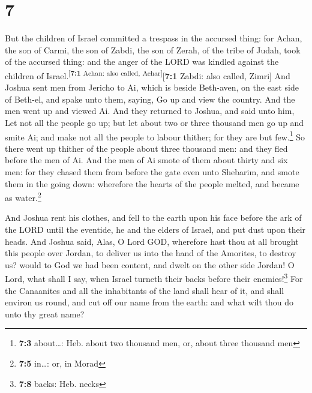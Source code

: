 \hypertarget{section-6}{%
\section{7}\label{section-6}}

 But the children of Israel committed a trespass in the
accursed thing: for Achan, the son of Carmi, the son of Zabdi, the son
of Zerah, of the tribe of Judah, took of the accursed thing: and the
anger of the LORD was kindled against the children of
Israel.\textsuperscript{{[}\textbf{7:1} Achan: also called,
Achar{]}}{[}\textbf{7:1} Zabdi: also called, Zimri{]}  And
Joshua sent men from Jericho to Ai, which is beside Beth-aven, on the
east side of Beth-el, and spake unto them, saying, Go up and view the
country. And the men went up and viewed Ai.  And they
returned to Joshua, and said unto him, Let not all the people go up; but
let about two or three thousand men go up and smite Ai; and make not all
the people to labour thither; for they are but few.\footnote{\textbf{7:3}
  about\ldots: Heb. about two thousand men, or, about three thousand men}
 So there went up thither of the people about three
thousand men: and they fled before the men of Ai.  And the
men of Ai smote of them about thirty and six men: for they chased them
from before the gate even unto Shebarim, and smote them in the going
down: wherefore the hearts of the people melted, and became as
water.\footnote{\textbf{7:5} in\ldots: or, in Morad}

 And Joshua rent his clothes, and fell to the earth upon
his face before the ark of the LORD until the eventide, he and the
elders of Israel, and put dust upon their heads.  And
Joshua said, Alas, O Lord GOD, wherefore hast thou at all brought this
people over Jordan, to deliver us into the hand of the Amorites, to
destroy us? would to God we had been content, and dwelt on the other
side Jordan!  O Lord, what shall I say, when Israel
turneth their backs before their enemies!\footnote{\textbf{7:8} backs:
  Heb. necks}  For the Canaanites and all the inhabitants
of the land shall hear of it, and shall environ us round, and cut off
our name from the earth: and what wilt thou do unto thy great name?

